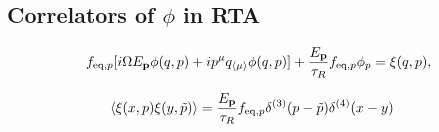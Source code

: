 \documentclass[aps,prd,preprint,nofootinbib,amsmath,amssymb,showpacs,longbibliography,singlecolumn,superscriptaddress,10pt]{revtex4-1}
\theoremstyle{plain}
\theoremstyle{definition}
\begin{document}
\subsection{Correlators of $\phi$ in RTA}



\begin{equation}
f_{\mathrm{eq},p} [i \Omega E_{\bf p}  \phi(q,p) + i p^{\mu} q_{\langle \mu \rangle} \phi(q,p)]  
+
\frac{E_{\bf p}}{\tau_{R}} f_{\mathrm{eq},p} \phi_{p} =  \xi(q,p) ,
\end{equation}


\begin{equation}
\begin{aligned}
&
\langle \xi(x, p) \xi(y,\Tilde{p}) \rangle
= \frac{E_{\bf p}}{\tau_{R}} f_{\mathrm{eq},p} \delta^{(3)}(p-\Tilde{p}) \delta^{(4)}(x-y)
\end{aligned}    
\end{equation}
\end{document}
